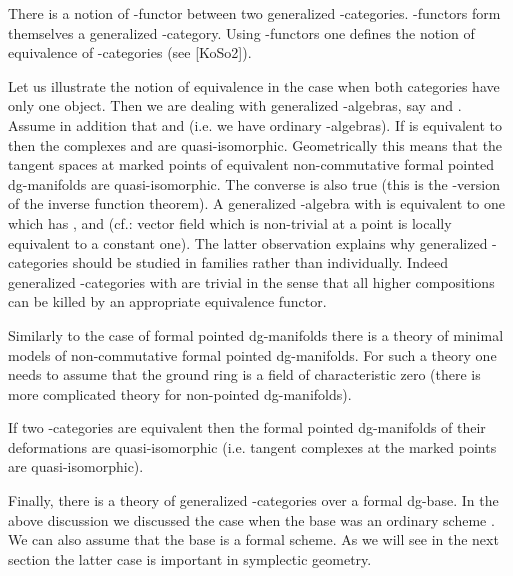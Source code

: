 \documentclass[a4paper,12pt]{article}
\begin{document}
There is a notion of \myHighlight{$\A$}\coordHE{}-functor between two generalized \myHighlight{$\A$}\coordHE{}-categories.
\myHighlight{$\A$}\coordHE{}-functors form themselves a generalized \myHighlight{$\A$}\coordHE{}-category.
Using \myHighlight{$\A$}\coordHE{}-functors one defines the notion of equivalence
of \myHighlight{$\A$}\coordHE{}-categories (see [KoSo2]).

Let us illustrate the  notion of equivalence in the case when
both categories have only one object.
Then we are dealing with generalized \myHighlight{$\A$}\coordHE{}-algebras, say \coordHE{} and \coordHE{}.
Assume in addition that \coordHE{} and \coordHE{} (i.e. we have
ordinary \myHighlight{$\A$}\coordHE{}-algebras).
If \coordHE{} is equivalent to \coordHE{} then the complexes
\coordHE{} and \coordHE{} are quasi-isomorphic.
Geometrically this means that the tangent 
spaces at marked points 
of equivalent non-commutative formal pointed dg-manifolds
are quasi-isomorphic. The  converse is also true (this is the \myHighlight{$\A$}\coordHE{}-version of the
inverse function theorem). A generalized \myHighlight{$\A$}\coordHE{}-algebra with \coordHE{}
is equivalent to one which has \coordHE{}, and \coordHE{}
(cf.: vector field which is non-trivial at a point
is locally equivalent to a constant one).
The latter observation explains 
why generalized \myHighlight{$\A$}\coordHE{}-categories should be studied
in families rather than individually. Indeed generalized \myHighlight{$\A$}\coordHE{}-categories
with \coordHE{} are trivial in the sense that all higher compositions
can be killed by an appropriate equivalence functor.

 Similarly to the case of formal pointed dg-manifolds
there is a theory of minimal models of non-commutative formal 
pointed dg-manifolds. For such a theory one needs to assume that the ground ring \coordHE{} is a field
of characteristic zero (there is more complicated  theory for non-pointed
dg-manifolds).

 If two \myHighlight{$\A$}\coordHE{}-categories are equivalent then the
formal pointed dg-manifolds of their deformations are quasi-isomorphic
(i.e. tangent complexes at the marked points are quasi-isomorphic).

Finally, there is a theory of generalized \myHighlight{$\A$}\coordHE{}-categories
over a formal dg-base. In the above discussion we discussed
 the case when the base was an ordinary scheme \coordHE{}. We can also assume that
the base is a formal scheme.  As we will see in the next section the latter case is important
in symplectic geometry.
\end{document}
